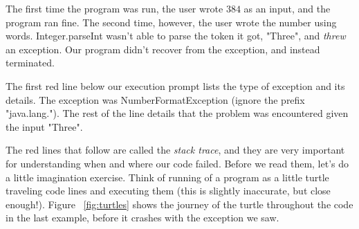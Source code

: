 The first time the program was run, the user wrote $384$ as an input, and the program ran fine. The second time, however, the user wrote the number using words. Integer.parseInt wasn't able to parse the token it got, "Three", and \emph{threw} an exception. Our program didn't recover from the exception, and instead terminated.

The first red line below our execution prompt lists the type of exception and its details. The exception was NumberFormatException (ignore the prefix "java.lang."). The rest of the line details that the problem was encountered given the input "Three".

The red lines that follow are called the \emph{stack trace}, and they are very important for understanding when and where our code failed. Before we read them, let's do a little imagination exercise. Think of running of a program as a little turtle traveling code lines and executing them (this is slightly inaccurate, but close enough!). Figure ~\ref{fig:turtles} shows the journey of the turtle throughout the code in the last example, before it crashes with the exception we saw. 

